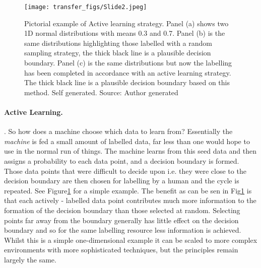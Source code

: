 \begin{figure}
  \texttt{[image: transfer\_figs/Slide2.jpeg]}
  \caption[Pictorial example of Active learning strategy.]{Pictorial example of Active learning strategy. Panel (a) shows two 1D normal distributions with means 0.3 and 0.7. Panel (b) is the same distributions highlighting those labelled with a random sampling strategy, the thick black line is a plausible decision boundary. Panel (c) is the same distributions but now the labelling has been completed in accordance with an active learning strategy. The thick black line is a plausible decision boundary based on this method. Self generated. Source: Author generated}
  \label{fig:active}
\end{figure}


\paragraph{Active Learning.}   \parencite{settles2009active}. So how does a machine choose which data to learn from? Essentially the \emph{machine} is fed a small amount of labelled data, far less than one would hope to use in the normal run of things. The machine learns from this seed data and then assigns a probability to each data point, and a decision boundary is formed.  Those data points that were difficult to decide upon i.e. they were close to the decision boundary are then chosen for labelling by a human and the cycle is repeated. See Figure\ref{fig:active} for a simple example. The benefit as can be sen in Fig\ref{fig:active} is that each actively - labelled data point contributes much more information to the formation of the decision boundary than those selected at random. Selecting points far away from the boundary generally has little effect on the decision boundary and so for the same labelling resource less information is achieved. Whilst this is a simple one-dimensional example it can be scaled to more complex environments with more sophisticated techniques, but the principles remain largely the same.

